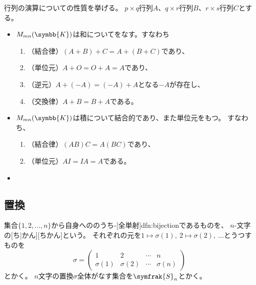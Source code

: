 \documentclass[../sotsu.tex]{subfiles}
\begin{document}
\begin{proposition}
    行列の演算についての性質を挙げる。
    $p \times q$行列$A$、$q \times r$行列$B$、$r \times s$行列$C$とする。
    \begin{itemize}
        \item $M_{mn}(\symbb{K})$は和についてをなす。すなわち
        \begin{enumerate}
            \item （結合律）$(A + B) + C = A + (B + C)$であり、
            \item （単位元）$A + O = O + A = A$であり、
            \item （逆元）$A + (-A) = (-A) + A$となる$-A$が存在し、
            \item （交換律）$A + B = B + A$である。
        \end{enumerate}
        \item $M_{mn}(\symbb{K})$は積について結合的であり、また単位元をもつ。
            すなわち、
        \begin{enumerate}
            \item （結合律）$(AB)C = A(BC)$であり、
            \item （単位元）$AI = IA = A$である。
        \end{enumerate}
        \item 
    \end{itemize}
\end{proposition}



\subsection{置換}

\begin{definition}
    \label{dfn:permutation}
    集合$\{ 1, 2, \dots, n \}$から自身へののうち-[全単射]{dfn:bijection}であるものを、
    $n$-文字の[ち|かん][ちかん]という。
    それぞれの元を$1 \mapsto \sigma(1), \  2 \mapsto \sigma(2), \  \dotsc$とうつすものを
    \begin{equation*}
        \sigma = 
        \begin{pmatrix}
                   1  &        2  & \cdots &        n  \\
            \sigma(1) & \sigma(2) & \cdots & \sigma(n)
        \end{pmatrix}
    \end{equation*}
    とかく。
    $n$文字の置換$\sigma$全体がなす集合を$\symfrak{S}_n$とかく。
\end{definition}
\end{document}
